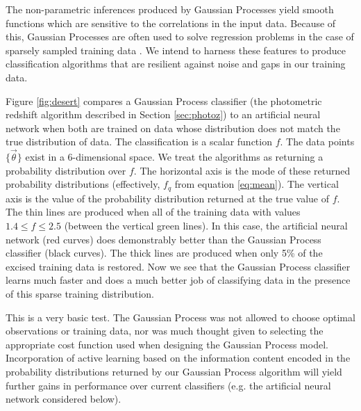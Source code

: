 \documentclass[useAMS,usenatbib,tightenlines,11pt,preprint]{aastex}
\begin{document}
The non-parametric inferences produced by
Gaussian Processes yield smooth functions which are sensitive to the
correlations in the input data.  Because of this, Gaussian Processes are
often used to solve regression problems in the case of
sparsely sampled training data \cite{wang2011,wang2012}.  
We intend to harness these features to produce classification algorithms that
are resilient against noise and gaps in our training data.

Figure \ref{fig:desert} compares a Gaussian Process classifier (the
photometric redshift algorithm described in Section \ref{sec:photoz}) to 
an artificial neural network when both are trained on
data whose distribution does not match the true distribution of data.  
The classification is a scalar function $f$.  
The data points $\{\vec{\theta}\}$
exist in a 6-dimensional space.  
We treat the algorithms as returning a probability distribution over $f$.  The horizontal axis is
the mode of these returned probability distributions (effectively, $f_q$ from equation
\ref{eq:mean}).  The vertical axis is the value of the probability distribution returned at the
true value of $f$.
The thin lines are
produced when all of the training data with values $1.4\le f\le
2.5$ (between the vertical green lines).  In this case, the artificial neural network
(red curves) does demonstrably better than the Gaussian Process classifier (black curves).
The thick lines are produced when only 5\% of the excised training data is restored.
Now we see that the Gaussian Process classifier learns much faster and does a much better job
of classifying data in the presence of this sparse training distribution.

This is a very basic test.  The Gaussian Process was not allowed to choose optimal observations or
training data, nor was much thought given to selecting the appropriate cost function used when
designing the Gaussian Process model.  Incorporation of active learning based on the information
content encoded in the probability distributions returned by our Gaussian Process algorithm will
yield further gains in performance over current classifiers (e.g. the artificial 
neural network considered below).
\end{document}
